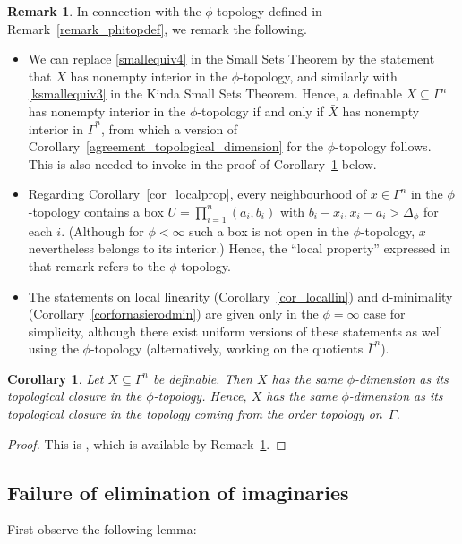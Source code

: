 \documentclass[11pt]{amsart}
\theoremstyle{plain}
\newtheorem{cor}[thm]{Corollary}
\theoremstyle{definition}
\newtheorem{remark}[thm]{Remark}
\numberwithin{equation}{section}
\newcommand\0{\varnothing}
\begin{document}
\begin{remark}\label{remark_phitop}
In connection with the $\phi$-topology defined in Remark~\ref{remark_phitopdef}, we remark the following.
\begin{itemize}
    \item We can replace \eqref{smallequiv4} in the Small Sets Theorem by the statement that $X$ has nonempty interior in the $\phi$-topology, and similarly with \eqref{ksmallequiv3} in the Kinda Small Sets Theorem. Hence, a definable $X \subseteq \Gamma^n$ has nonempty interior in the $\phi$-topology if and only if $\bar{X}$ has nonempty interior in $\bar{\Gamma}^n$, from which a version of Corollary~\ref{agreement_topological_dimension} for the $\phi$-topology follows. This is also needed to invoke \cite[Proposition~2.1]{fornasierohalupczok} in the proof of Corollary~\ref{dim_equals_dim_closure} below.
    \item Regarding Corollary~\ref{cor_localprop}, every neighbourhood of $x\in \Gamma^n$ in the $\phi$-topology contains a box $U = \prod_{i=1}^n(a_i,b_i)$ with $b_i-x_i, x_i-a_i>\Delta_\phi$ for each $i$. (Although for $\phi<\infty$ such a box is not open in the $\phi$-topology, $x$ nevertheless belongs to its interior.) Hence, the ``local property'' expressed in that remark refers to the $\phi$-topology.
    \item The statements on local linearity (Corollary~\ref{cor_locallin}) and d-minimality (Corollary~\ref{corfornasierodmin}) are given only in the $\phi=\infty$ case for simplicity, although there exist uniform versions of these statements as well using the $\phi$-topology (alternatively, working on the quotients $\bar{\Gamma}^n$).
\end{itemize}
\end{remark}

\begin{cor}\label{dim_equals_dim_closure}
Let $X\subseteq\Gamma^n$ be definable.
Then $X$ has the same $\phi$-dimension as its topological closure in the $\phi$-topology.
Hence, $X$ has the same $\phi$-dimension as its topological closure in the topology coming from the order topology on~$\Gamma$. \end{cor}
\begin{proof}
This is \cite[Proposition~2.1]{fornasierohalupczok}, which is available by Remark~\ref{remark_phitop}.
\end{proof}

\subsection{Failure of elimination of imaginaries}\label{subsec_EIfailure} First observe the following lemma:
\end{document}
